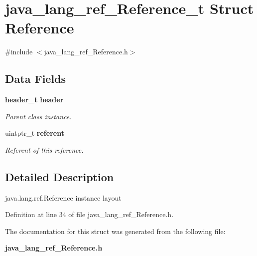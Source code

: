 \section{java\_\-lang\_\-ref\_\-Reference\_\-t Struct Reference}
\label{structjava__lang__ref___reference__t}


{\ttfamily \#include $<$java\_\-lang\_\-ref\_\-Reference.h$>$}

\subsection*{Data Fields}
\begin{DoxyCompactItemize}
\item 
{\bf header\_\-t} {\bf header}\label{structjava__lang__ref___reference__t_a1b9d4ae69f2599b0193d7ef3f09a9bae}

\begin{DoxyCompactList}\small\item\em Parent class instance. \item\end{DoxyCompactList}\item 
uintptr\_\-t {\bf referent}\label{structjava__lang__ref___reference__t_a4fc445134ad17d523c0a090a663fc8e4}

\begin{DoxyCompactList}\small\item\em Referent of this reference. \item\end{DoxyCompactList}\end{DoxyCompactItemize}


\subsection{Detailed Description}
java.lang.ref.Reference instance layout 

Definition at line 34 of file java\_\-lang\_\-ref\_\-Reference.h.



The documentation for this struct was generated from the following file:\begin{DoxyCompactItemize}
\item 
{\bf java\_\-lang\_\-ref\_\-Reference.h}\end{DoxyCompactItemize}
